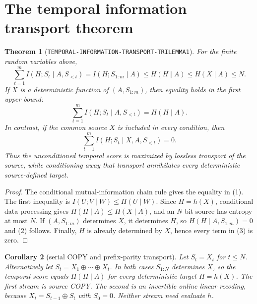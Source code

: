 \documentclass[11pt]{article}
\newtheorem{theorem}{Theorem}
\newtheorem{corollary}[theorem]{Corollary}
\newcommand{\claim}[1]{\texttt{#1}}
\begin{document}
\section{The temporal information transport theorem}
\begin{theorem}[\claim{TEMPORAL-INFORMATION-TRANSPORT-TRILEMMA1}]
For the finite random variables above,
\begin{equation}
 \sum_{t=1}^{m} I(H;S_t\mid A,S_{<t})
   = I(H;S_{1:m}\mid A)
   \le H(H\mid A)\le H(X\mid A)\le N.       \tag{1}
\end{equation}
If $X$ is a deterministic function of $(A,S_{1:m})$, then equality holds in
the first upper bound:
\begin{equation}
 \sum_{t=1}^{m} I(H;S_t\mid A,S_{<t})=H(H\mid A). \tag{2}
\end{equation}
In contrast, if the common source $X$ is included in every condition, then
\begin{equation}
 \sum_{t=1}^{m}I(H;S_t\mid X,A,S_{<t})=0.       \tag{3}
\end{equation}
Thus the unconditioned temporal score is maximized by lossless transport of
the source, while conditioning away that transport annihilates every
deterministic source-defined target.
\end{theorem}

\begin{proof}
The conditional mutual-information chain rule gives the equality in (1).
The first inequality is $I(U;V\mid W)\le H(U\mid W)$.  Since $H=h(X)$,
conditional data processing gives $H(H\mid A)\le H(X\mid A)$, and an
$N$-bit source has entropy at most $N$.  If $(A,S_{1:m})$ determines $X$, it
determines $H$, so $H(H\mid A,S_{1:m})=0$ and (2) follows.  Finally, $H$ is
already determined by $X$, hence every term in (3) is zero.
\end{proof}

\begin{corollary}[serial COPY and prefix-parity transport]
Let $S_t=X_t$ for $t\le N$.  Alternatively let
$S_t=X_1\oplus\cdots\oplus X_t$.  In both cases $S_{1:N}$ determines $X$,
so the temporal score equals $H(H\mid A)$ for every deterministic target
$H=h(X)$.  The first stream is source COPY.  The second is an invertible
online linear recoding, because $X_t=S_{t-1}\oplus S_t$ with $S_0=0$.
Neither stream need evaluate $h$.
\end{corollary}
\end{document}
